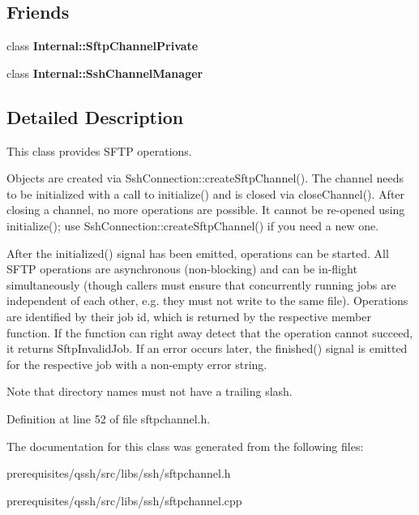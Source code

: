 \subsection*{Friends}
\begin{DoxyCompactItemize}
\item 
\mbox{\label{class_q_ssh_1_1_sftp_channel_ae701abaaf26b484832858956c94daf43}} 
class {\bfseries Internal\+::\+Sftp\+Channel\+Private}
\item 
\mbox{\label{class_q_ssh_1_1_sftp_channel_a5a13e7a749b7e2d0ce43e5d17a60afaf}} 
class {\bfseries Internal\+::\+Ssh\+Channel\+Manager}
\end{DoxyCompactItemize}


\subsection{Detailed Description}
This class provides S\+F\+TP operations. 

Objects are created via Ssh\+Connection\+::create\+Sftp\+Channel(). The channel needs to be initialized with a call to initialize() and is closed via close\+Channel(). After closing a channel, no more operations are possible. It cannot be re-\/opened using initialize(); use Ssh\+Connection\+::create\+Sftp\+Channel() if you need a new one.

After the initialized() signal has been emitted, operations can be started. All S\+F\+TP operations are asynchronous (non-\/blocking) and can be in-\/flight simultaneously (though callers must ensure that concurrently running jobs are independent of each other, e.\+g. they must not write to the same file). Operations are identified by their job id, which is returned by the respective member function. If the function can right away detect that the operation cannot succeed, it returns Sftp\+Invalid\+Job. If an error occurs later, the finished() signal is emitted for the respective job with a non-\/empty error string.

Note that directory names must not have a trailing slash. 

Definition at line 52 of file sftpchannel.\+h.



The documentation for this class was generated from the following files\+:\begin{DoxyCompactItemize}
\item 
prerequisites/qssh/src/libs/ssh/sftpchannel.\+h\item 
prerequisites/qssh/src/libs/ssh/sftpchannel.\+cpp\end{DoxyCompactItemize}
